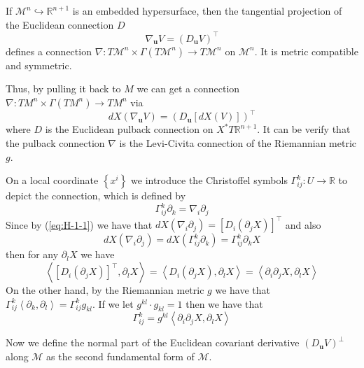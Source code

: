 \begin{lemma}\label{lem:H}
    If $\mathcal{M}^n\hookrightarrow\mathbb{R}^{n+1}$ is an embedded hypersurface, then the tangential projection of the Euclidean connection $D$
    \begin{equation}
        \nabla_{\boldsymbol{u}}V={\left(D_{\boldsymbol{u}}V\right)}^{\top}
    \end{equation}
    defines a connection $\nabla:T\mathcal{M}^n\times\Gamma(T\mathcal{M}^n)\to T\mathcal{M}^n$ on $\mathcal{M}^n$. It is metric compatible and symmetric.
\end{lemma}

Thus, by pulling it back to $M$ we can get a connection $\nabla: TM^n\times \Gamma(TM^n)\to TM^n$ via
\begin{equation}\label{eq:H-1-1}
    dX(\nabla_{\boldsymbol{u}}V)={\left(D_{\boldsymbol{u}}[dX(V)]\right)}^\top
\end{equation}
where $D$ is the Euclidean pulback connection on $X^* T\mathbb{R}^{n+1}$. It can be verify that the pulback connection $\nabla$ is the Levi-Civita connection of the Riemannian metric $g$.

On a local coordinate ${\left\{x^i\right\}}$ we introduce the Christoffel symbols $\Gamma^k_{ij}:U\to \mathbb{R}$ to depict the connection, which is defined by
\begin{equation}
    \Gamma^k_{ij}\partial_k=\nabla_i\partial_j
\end{equation}
Since by (\ref{eq:H-1-1}) we have that $dX(\nabla_i\partial_j)={[D_i(\partial_j X)]}^\top$ and also
\begin{equation*}
    dX\left(\nabla_i\partial_j\right)=dX\left(\Gamma^k_{ij}\partial_k\right)=\Gamma^k_{ij}\partial_k X
\end{equation*}
then for any $\partial_l X$ we have
\begin{equation*}
    \left<{\left[D_i(\partial_j X)\right]}^\top,\partial_l X\right>=\left<D_i(\partial_j X),\partial_l X\right>=\left<\partial_i\partial_j X,\partial_l X\right>
\end{equation*}
On the other hand, by the Riemannian metric $g$ we have that $\Gamma^k_{ij}\left<\partial_k,\partial_l\right>=\Gamma^k_{ij}g_{kl}$. If we let $g^{kl}\cdot g_{kl}=1$ then we have that
\begin{equation*}
    \Gamma^k_{ij}=g^{kl}\left<\partial_i\partial_j X,\partial_l X\right>
\end{equation*}

Now we define the normal part of the Euclidean covariant derivative ${(D_{\boldsymbol{u}}V)}^\bot$ along $\mathcal{M}$ as the second fundamental form of $\mathcal{M}$.

